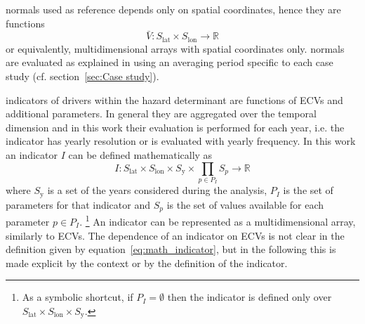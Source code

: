 \Glspl{normal} used as reference depends only on spatial coordinates, hence they are functions
\begin{equation}
  \label{eq:math_normal}
  \bar{V} : S_\text{lat} \times S_\text{lon} \to \mathbb{R}
\end{equation}
or equivalently, multidimensional arrays with spatial coordinates only.
\Glspl{normal} are evaluated as explained in \cite[6]{2017WorldMeteorologicalOrganizationWMOWMOGuidelines} using an averaging period specific to each case study (cf. section~\ref{sec:Case study}).

\Glspl{indicator} of \glspl{driver} within the \gls{hazard} \gls{determinant} are functions of \glspl{ECV} and additional parameters. In general they are aggregated over the temporal dimension and in this work their evaluation is performed for each year, i.e. the \gls{indicator} has yearly resolution or is evaluated with yearly frequency.
In this work an \gls{indicator} $I$ can be defined mathematically as
\begin{equation}
  \label{eq:math_indicator}
  I : S_\text{lat} \times S_\text{lon} \times S_\text{y} \times \prod_{p \in P_I} S_p \to \mathbb{R}
\end{equation}
where $S_\text{y}$ is a set of the years considered during the analysis, $P_I$ is the set of parameters for that indicator and $S_p$ is the set of values available for each parameter $p \in P_I$.%
\footnote{As a symbolic shortcut, if $P_I = \emptyset$ then the indicator is defined only over $S_\text{lat} \times S_\text{lon} \times S_\text{y}$.}
An \gls{indicator} can be represented as a multidimensional array, similarly to \glspl{ECV}.
The dependence of an \gls{indicator} on \glspl{ECV} is not clear in the definition given by equation~\eqref{eq:math_indicator}, but in the following this is made explicit by the context or by the definition of the \gls{indicator}.

